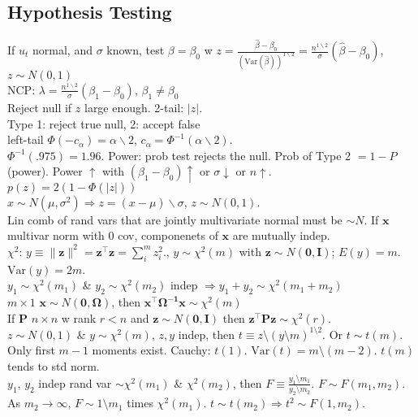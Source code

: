 \subsection*{Hypothesis Testing}
If $u_t$ normal, and $\sigma$ known, test $\beta=\beta_0$ w
$z = \frac{\hat{\beta} - \beta_0}{(\text{Var}(\hat{\beta}))^{1 \backslash 2}} = \frac{n^{1 \backslash 2}}{\sigma}(\hat{\beta} - \beta_0)$, $z \sim N(0,1)$\\
NCP: $\lambda = \frac{n^{1 \backslash 2}}{\sigma} (\beta_1 - \beta_0)$, $\beta_1 \neq \beta_0$\\
Reject null if $z$ large enough.
2-tail: $\lvert z \rvert$.\\
Type 1: reject true null, 2: accept false\\
left-tail $\Phi(-c_{\alpha}) = \alpha \backslash 2$, $c_\alpha = \Phi^{-1} (\alpha \backslash 2)$.\\
$\Phi^{-1}(.975) = 1.96$.
Power: prob test rejects the null.
Prob of Type 2 $= 1 - P$(power).
Power $\uparrow$ with $(\beta_1 - \beta_0) \uparrow$ or $\sigma \downarrow$ or $n \uparrow$.\\
$p(z) = 2(1-\Phi(\lvert z \rvert))$\\
$x \sim N(\mu, \sigma^2) \Rightarrow z = (x-\mu) \backslash \sigma$, $z \sim N(0,1)$.\\
Lin comb of rand vars that are jointly multivariate normal must be $\sim N$.
If $\mathbf{x}$ multivar norm with 0 cov, componenets of $\mathbf{x}$ are mutually indep.\\
$\chi^2$: $y \equiv \lVert \mathbf{z} \rVert^2 = \mathbf{z^{\top}z} = \sum_{i}^{m} z_i ^2$., $y \sim \chi^2(m)$
with $\mathbf{z} \sim N(\mathbf{0,I})$; $E(y) = m$.
$\text{Var}(y) = 2m$.\\
$y_1 \sim \chi^2(m_1)$ \& $y_2 \sim \chi^2(m_2)$ indep $\Rightarrow y_1 + y_2 \sim \chi^2 (m_1 + m_2)$\\
$m\times1$ $\mathbf{x} \sim N(\mathbf{0,\Omega})$, then $\mathbf{x^{\top}\Omega^{-1}x} \sim \chi^2(m)$\\
If $\mathbf{P}$ $n \times n$ w rank $r < n$ and $\mathbf{z} \sim N(\mathbf{0,I})$ then $\mathbf{z^{\top}Pz} \sim \chi^2(r)$.\\
$z \sim N(0,1)$ \& $y \sim \chi^2(m)$, $z,y$ indep, then $t \equiv z \setminus (y \setminus m)^{1 \setminus 2}$.
Or $t \sim t(m)$.
Only first $m-1$ moments exist.
Cauchy: $t(1)$.
$\text{Var}(t) = m \setminus (m-2)$.
$t(m)$ tends to std norm.\\
$y_1$, $y_2$ indep rand var $\sim \chi^2 (m_1)$ \& $\chi^2(m_2)$, then $F \equiv \frac{y_1 \setminus m_1}{y_2 \setminus m_2}$.
$F \sim F(m_1, m_2)$.
As $m_2 \rightarrow \infty$, $F \sim 1 \setminus m_1$ times $\chi^2 (m_1)$.
$t \sim t(m_2) \Rightarrow t^2 \sim F(1,m_2)$.\\
